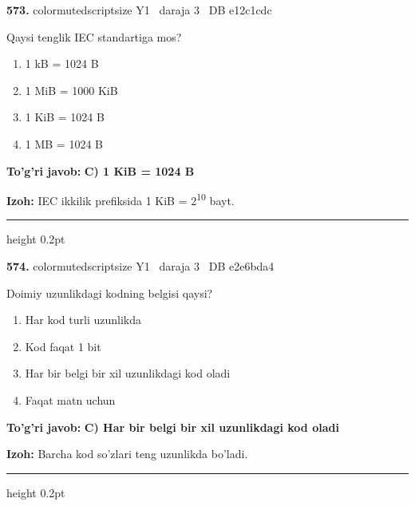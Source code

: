\documentclass[10pt,a4paper,oneside]{article}
\begin{document}
\noindent\textbf{\color{ink}573.}  {color{muted}scriptsize Y1 \textbullet\ daraja 3 \textbullet\ DB e12c1cdc}
\par
Qaysi tenglik IEC standartiga mos?
\begin{enumerate}[label=\Alph*),leftmargin=9mm]
\item 1 kB = 1024 B
\item 1 MiB = 1000 KiB
\item 1 KiB = 1024 B
\item 1 MB = 1024 B
\end{enumerate}
\begin{tcolorbox}[enhanced,breakable,colback=teal!4,colframe=teal!50!black,boxrule=0.5pt,arc=1.1mm,left=3mm,right=3mm,top=1.7mm,bottom=1.7mm,before skip=2mm,after skip=2mm]
\textbf{\color{teal}To'g'ri javob:} \textbf{C) 1 KiB = 1024 B}
\par\smallskip
\textbf{Izoh:} IEC ikkilik prefiksida 1 KiB = 2\textsuperscript{1}\textsuperscript{0} bayt.
\end{tcolorbox}
\vspace{2mm}\hrule height 0.2pt \vspace{3mm}

\noindent\textbf{\color{ink}574.}  {color{muted}scriptsize Y1 \textbullet\ daraja 3 \textbullet\ DB e2e6bda4}
\par
Doimiy uzunlikdagi kodning belgisi qaysi?
\begin{enumerate}[label=\Alph*),leftmargin=9mm]
\item Har kod turli uzunlikda
\item Kod faqat 1 bit
\item Har bir belgi bir xil uzunlikdagi kod oladi
\item Faqat matn uchun
\end{enumerate}
\begin{tcolorbox}[enhanced,breakable,colback=teal!4,colframe=teal!50!black,boxrule=0.5pt,arc=1.1mm,left=3mm,right=3mm,top=1.7mm,bottom=1.7mm,before skip=2mm,after skip=2mm]
\textbf{\color{teal}To'g'ri javob:} \textbf{C) Har bir belgi bir xil uzunlikdagi kod oladi}
\par\smallskip
\textbf{Izoh:} Barcha kod so'zlari teng uzunlikda bo'ladi.
\end{tcolorbox}
\vspace{2mm}\hrule height 0.2pt \vspace{3mm}
\end{document}
